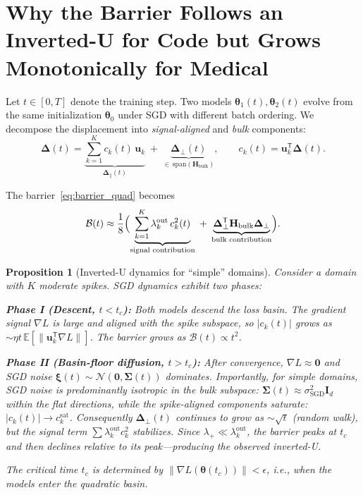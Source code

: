 \documentclass{article}
\newtheorem{proposition}{Proposition}
\newcommand{\E}{\mathbb{E}}
\newcommand{\Hess}{\mathbf{H}}
\newcommand{\btheta}{\bm{\theta}}
\newcommand{\bDelta}{\bm{\Delta}}
\newcommand{\bxi}{\bm{\xi}}
\begin{document}
\section{Why the Barrier Follows an Inverted-U for Code but Grows Monotonically for Medical}

Let $t\in[0,T]$ denote the training step. Two models $\btheta_1(t),\btheta_2(t)$
evolve from the same initialization $\btheta_0$ under SGD with different batch ordering.
We decompose the displacement into \emph{signal-aligned} and \emph{bulk} components:
\begin{equation}
\bDelta(t) = \underbrace{\sum_{k=1}^K c_k(t)\,\mathbf{u}_k}_{\bDelta_\parallel(t)}
\;+\; \underbrace{\bDelta_\perp(t)}_{\in\,\mathrm{span}(\Hess_{\mathrm{bulk}})},
\qquad c_k(t) = \mathbf{u}_k^{\mathsf T}\bDelta(t).
\end{equation}

The barrier~\eqref{eq:barrier_quad} becomes
\begin{equation}
\mathcal{B}(t) \approx \frac{1}{8}\Bigl(
\underbrace{\sum_{k=1}^K \lambda_k^{\mathrm{out}}\,c_k^2(t)}_{\text{signal contribution}}
\;+\;
\underbrace{\bDelta_\perp^{\mathsf T}\Hess_{\mathrm{bulk}}\bDelta_\perp}_{\text{bulk contribution}}
\Bigr).
\label{eq:barrier_decomposed}
\end{equation}

\begin{proposition}[Inverted-U dynamics for ``simple'' domains]\label{prop:inverted_u}
Consider a domain with $K$ moderate spikes. SGD dynamics exhibit two phases:

\noindent\textbf{Phase I (Descent, $t<t_c$):} Both models descend the loss basin.
The gradient signal $\nabla L$ is large and aligned with the spike subspace,
so $|c_k(t)|$ grows as $\sim\eta t\,\E[\|\mathbf{u}_k^{\mathsf T}\nabla L\|]$.
The barrier \emph{grows} as $\mathcal{B}(t)\propto t^2$.

\noindent\textbf{Phase II (Basin-floor diffusion, $t>t_c$):} After convergence,
$\nabla L\approx\bm{0}$ and SGD noise $\bxi(t)\sim\mathcal{N}(\bm{0},\bm{\Sigma}(t))$ dominates.
Importantly, for \emph{simple} domains, SGD noise is predominantly isotropic in the bulk subspace:
$\bm{\Sigma}(t)\approx\sigma_{\mathrm{SGD}}^2\mathbf{I}_d$ within the flat directions, while
the spike-aligned components \emph{saturate}: $|c_k(t)|\to c_k^{\mathrm{sat}}$.
Consequently $\bDelta_\perp(t)$ continues to grow as $\sim\sqrt{t}$ (random walk),
but the signal term $\sum\lambda_k^{\mathrm{out}}c_k^2$ stabilizes.
Since $\lambda_+\ll\lambda_k^{\mathrm{out}}$, the barrier peaks at $t_c$ and then \emph{declines}
relative to its peak---producing the observed inverted-U.

The critical time $t_c$ is determined by $\|\nabla L(\btheta(t_c))\|<\epsilon$,
i.e., when the models enter the quadratic basin.
\end{proposition}
\end{document}

